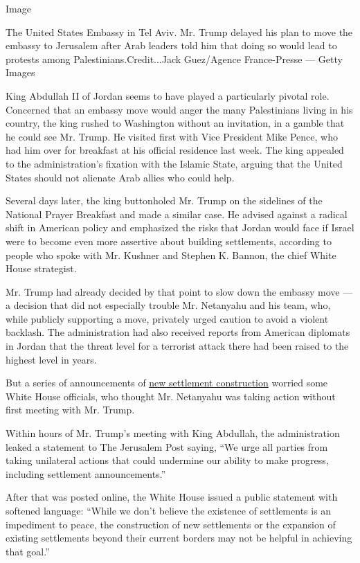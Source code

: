 Image

The United States Embassy in Tel Aviv. Mr. Trump delayed his plan to
move the embassy to Jerusalem after Arab leaders told him that doing so
would lead to protests among Palestinians.Credit...Jack Guez/Agence
France-Presse --- Getty Images

King Abdullah II of Jordan seems to have played a particularly pivotal
role. Concerned that an embassy move would anger the many Palestinians
living in his country, the king rushed to Washington without an
invitation, in a gamble that he could see Mr. Trump. He visited first
with Vice President Mike Pence, who had him over for breakfast at his
official residence last week. The king appealed to the administration's
fixation with the Islamic State, arguing that the United States should
not alienate Arab allies who could help.

Several days later, the king buttonholed Mr. Trump on the sidelines of
the National Prayer Breakfast and made a similar case. He advised
against a radical shift in American policy and emphasized the risks that
Jordan would face if Israel were to become even more assertive about
building settlements, according to people who spoke with Mr. Kushner and
Stephen K. Bannon, the chief White House strategist.

Mr. Trump had already decided by that point to slow down the embassy
move --- a decision that did not especially trouble Mr. Netanyahu and
his team, who, while publicly supporting a move, privately urged caution
to avoid a violent backlash. The administration had also received
reports from American diplomats in Jordan that the threat level for a
terrorist attack there had been raised to the highest level in years.

But a series of announcements of
\href{https://www.nytimes3xbfgragh.onion/2017/02/01/world/middleeast/israel-3000-homes-west-bank.html}{new
settlement construction} worried some White House officials, who thought
Mr. Netanyahu was taking action without first meeting with Mr. Trump.

Within hours of Mr. Trump's meeting with King Abdullah, the
administration leaked a statement to The Jerusalem Post saying, ``We
urge all parties from taking unilateral actions that could undermine our
ability to make progress, including settlement announcements.''

After that was posted online, the White House issued a public statement
with softened language: ``While we don't believe the existence of
settlements is an impediment to peace, the construction of new
settlements or the expansion of existing settlements beyond their
current borders may not be helpful in achieving that goal.''

